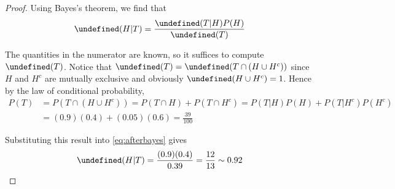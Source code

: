 \documentclass[letterpaper,11pt]{article}
\let\P\undefined
\DeclareMathOperator{\P}{\mathbb{P}}
\newcommand{\intersn}{\cap}
\newcommand{\union}{\cup}
\begin{document}
\begin{enumerate}
\begin{proof}
            Using Bayes's theorem, we find that
            \begin{equation}
                \label{eq:afterbayes}
                \P(H|T) = \frac{\P(T|H) P(H)}{\P(T)}
            \end{equation}

            The quantities in the numerator are known, so it suffices to
            compute $\P(T)$. Notice that
            $\P(T) = \P(T \intersn (H \union H^c))$
            since $H$ and $H^c$ are mutually exclusive and
            obviously $\P(H \union H^c) = 1$. Hence by the law of conditional
            probability,
            \begin{align*}
                P(T)
                &= P(T \intersn (H \union H^c))
                = P(T \intersn H) + P(T \intersn H^c)
                = P(T | H) P(H) + P(T | H^c) P(H^c) \\
                &= (0.9) (0.4) + (0.05) (0.6)
                = \frac{39}{100}
            \end{align*}

            Substituting this result into \eqref{eq:afterbayes} gives
            \begin{equation*}
                \P(H|T) = \frac{(0.9) (0.4)}{0.39} = \frac{12}{13} \sim 0.92
            \end{equation*}
        \end{proof}
\end{enumerate}
\end{document}
